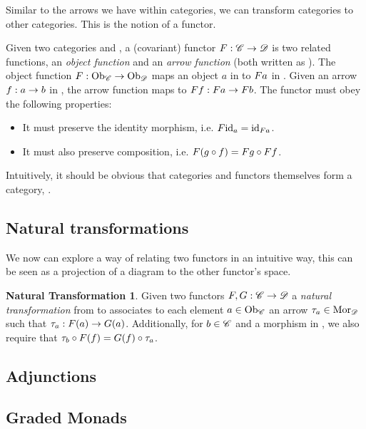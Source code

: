 Similar to the arrows we have within categories, we can transform categories to other categories. This is the notion of a functor.
\begin{covfunctordef}
  Given two categories  and , a (covariant) functor $\mathnormal{F}: \mathscr{C} \to \mathscr{D}$ is two related functions, an \emph{object function} and an \emph{arrow function} (both written as ). The object function $\mathnormal{F}: \mathrm{Ob}_{\mathscr{C}} \to \mathrm{Ob}_{\mathscr{D}}$ maps an object $a$ in  to $\mathnormal{F} \mathnormal{a}$ in . Given an arrow $\mathnormal{f}: \mathnormal{a} \to \mathnormal{b}$ in , the arrow function maps  to $\mathnormal{F} \mathnormal{f}: \mathnormal{F} \mathnormal{a} \to \mathnormal{F} \mathnormal{b}$. The functor must obey the following properties: 
  \begin{itemize}
    \item It must preserve the identity morphism, i.e. $\mathnormal{F} \mathnormal{\mathrm{id}_{\mathnormal{a}}} = \mathrm{id}_{\mathnormal{\mathnormal{F} \mathnormal{a}}}$.
    \item It must also preserve composition, i.e. $\mathnormal{F} \mathnormal{\left(\mathnormal{g} \circ \mathnormal{f}\right)} = \mathnormal{F} \mathnormal{\mathnormal{g}} \circ \mathnormal{F} \mathnormal{\mathnormal{f}}$.
  \end{itemize}
\end{covfunctordef}

Intuitively, it should be obvious that categories and functors themselves form a category, .\\

\subsection{Natural transformations}
\theoremstyle{definition}\newtheorem*{nattransdef}{Natural Transformation}
We now can explore a way of relating two functors in an intuitive way, this can be seen as a projection of a diagram to the other functor's space. 
\begin{nattransdef}
Given two functors $\mathnormal{F}, \mathnormal{G} : \mathscr{C} \to \mathscr{D}$ a \emph{natural transformation} \nattrans{\tau} from  to  associates to each element $\mathnormal{a} \in \mathrm{Ob}_{\mathscr{C}}$ an arrow $\tau_{a} \in \mathrm{Mor}_{\mathscr{D}}$ such that $\tau_{a}: \mathnormal{F} \mathnormal{(a)} \to \mathnormal{G} \mathnormal{(a)}$. Additionally, for $\mathnormal{b} \in \mathscr{C}$ and  a morphism in , we also require that $\tau_{b} \circ \mathnormal{F} \mathnormal{(f)} = \mathnormal{G} \mathnormal{(f)} \circ \tau_{a}$.

\end{nattransdef}
\subsection{Adjunctions}
\subsection{Graded Monads}\label{sec:gradedmonads}